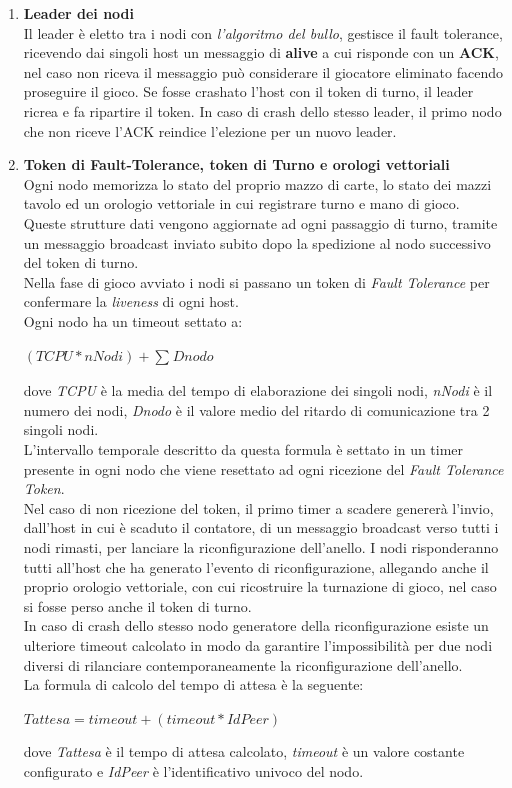 \documentclass[10pt,a4paper]{article}
\begin{document}
\begin{enumerate}
\item \textbf{Leader dei nodi}\\ Il leader è eletto tra i nodi con \textit{l'algoritmo del bullo}, gestisce il fault tolerance, ricevendo dai singoli host un messaggio di \textbf{alive} a cui risponde con un \textbf{ACK}, nel caso non riceva il messaggio può considerare il giocatore eliminato facendo proseguire il gioco. Se fosse crashato l'host con il token di turno, il leader ricrea e fa ripartire il token. In caso di crash dello stesso leader, il primo nodo che non riceve l'ACK reindice l'elezione per un nuovo leader. 

\item \textbf{Token di Fault-Tolerance, token di Turno e orologi vettoriali}\\ Ogni nodo memorizza lo stato del proprio mazzo di carte, lo stato dei mazzi tavolo ed un orologio vettoriale in cui registrare turno e mano di gioco. Queste strutture dati vengono aggiornate ad ogni passaggio di turno, tramite un messaggio broadcast inviato subito dopo la spedizione al nodo successivo del token di turno.\\ Nella fase di gioco avviato i nodi si passano un token di \textit{Fault Tolerance} per confermare la \textit{liveness} di ogni host. \\ Ogni nodo ha un timeout settato a: \\\begin{center}$(TCPU*nNodi)+\sum_{}Dnodo$\end{center} dove \textit{TCPU} è la media del tempo di elaborazione dei singoli nodi, \textit{nNodi} è il numero dei nodi, \textit{Dnodo} è il valore medio del ritardo di comunicazione tra 2 singoli nodi.\\L'intervallo temporale descritto da questa formula è settato in un timer presente in ogni nodo che viene resettato ad ogni ricezione del \textit{Fault Tolerance Token}.\\ Nel caso di non ricezione del token, il primo timer a scadere genererà l'invio, dall'host in cui è scaduto il contatore, di un messaggio broadcast verso tutti i nodi rimasti, per lanciare la riconfigurazione dell'anello. I nodi risponderanno tutti all'host che ha generato l'evento di riconfigurazione, allegando anche il proprio orologio vettoriale, con cui ricostruire la turnazione di gioco, nel caso si fosse perso anche il token di turno. \\ In caso di crash dello stesso nodo generatore della riconfigurazione esiste un ulteriore timeout calcolato in modo da garantire l'impossibilità per due nodi diversi di rilanciare contemporaneamente la riconfigurazione dell'anello.\\ La formula di calcolo del tempo di attesa è la seguente:\begin{center}$Tattesa = timeout +(timeout * IdPeer)$\end{center}dove \textit{Tattesa} è il tempo di attesa calcolato, \textit{timeout} è un valore costante configurato e \textit{IdPeer} è l'identificativo univoco del nodo.\end{enumerate}
\end{document}
